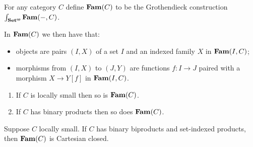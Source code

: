 \begin{definition}
For any category $C$ define $\mathbf{Fam}(C)$ to be the Grothendieck construction
$\int_{\mathbf{Set}^{\mathsf{op}}}\mathbf{Fam}(-,C)$.
\end{definition}

In $\mathbf{Fam}(C)$ we then have that:
\begin{itemize}
\item objects are pairs $(I, X)$ of a set $I$ and an indexed family $X$ in $\mathbf{Fam}(I,C)$;
\item morphisms from $(I, X)$ to $(J, Y)$ are functions $f: I \to J$ paired with a morphism $X \to Y[f]$ in
$\mathbf{Fam}(I,C)$.
\end{itemize}

\begin{proposition}
\item
\begin{enumerate}
\item If $C$ is locally small then so is $\mathbf{Fam}(C)$.
\item If $C$ has binary products then so does $\mathbf{Fam}(C)$.
\end{enumerate}
\end{proposition}

\begin{proposition}
Suppose $C$ locally small. If $C$ has binary biproducts and set-indexed products, then $\mathbf{Fam}(C)$ is Cartesian
closed. 
\end{proposition}


